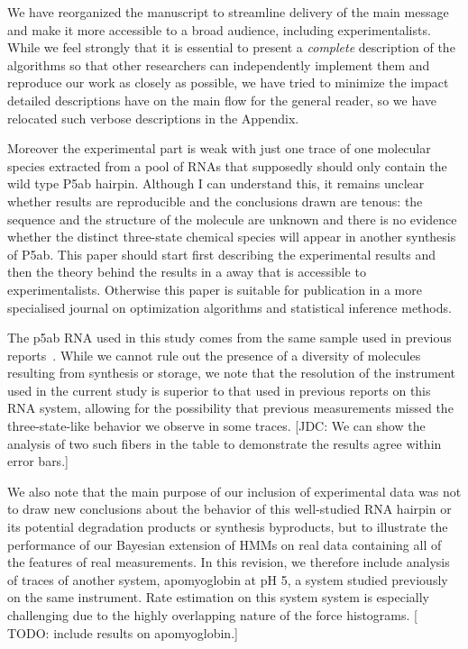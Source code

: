 \documentclass[ucb,qb3,10pt,fullfrom]{ucletter}
\begin{document}
\begin{letter}{}
We have reorganized the manuscript to streamline delivery of the main message and make it more accessible to a broad audience, including experimentalists.
While we feel strongly that it is essential to present a \emph{complete} description of the algorithms so that other researchers can independently implement them and reproduce our work as closely as possible, we have tried to minimize the impact detailed descriptions have on the main flow for the general reader, so we have relocated such verbose descriptions in the Appendix.

\color{red}
Moreover the experimental part is weak with just one trace of one molecular species extracted from a pool of RNAs that supposedly should only contain the wild type P5ab hairpin. Although I can understand this, it remains unclear whether results are reproducible and the conclusions drawn are tenous: the sequence and the structure of the molecule are unknown and there is no evidence whether the distinct three-state chemical species will appear in another synthesis of P5ab. This paper should start first describing the experimental results and then the theory behind the results in a away that is accessible to experimentalists. Otherwise this paper is suitable for publication in a more specialised journal on optimization algorithms and statistical inference methods.
\color{black}

The p5ab RNA used in this study comes from the same sample used in previous reports~\cite{liphardt:science:2001:p5ab,wen-manosas:biophys-j:2007:rna-optical-tweezers,wen-manosas:biophys-j:2007:rna-optical-tweezers-2,elms:biophys-j:2012:force-feedback}.
While we cannot rule out the presence of a diversity of molecules resulting from synthesis or storage, we note that the resolution of the instrument used in the current study is superior to that used in previous reports on this RNA system, allowing for the possibility that previous measurements missed the three-state-like behavior we observe in some traces. 
{\color{blue}[JDC: We can show the analysis of two such fibers in the table to demonstrate the results agree within error bars.]}

We also note that the main purpose of our inclusion of experimental data was not to draw new conclusions about the behavior of this well-studied RNA hairpin or its potential degradation products or synthesis byproducts, but to illustrate the performance of our Bayesian extension of HMMs on real data containing all of the features of real measurements.
In this revision, we therefore include analysis of traces of another system, apomyoglobin at pH 5, a system studied previously~\cite{elms:pnas:2012:apo-myoglobin} on the same instrument. 
Rate estimation on this system system is especially challenging due to the highly overlapping nature of the force histograms.
{[\color{blue} TODO: include results on apomyoglobin.]}


\end{letter}
\end{document}
